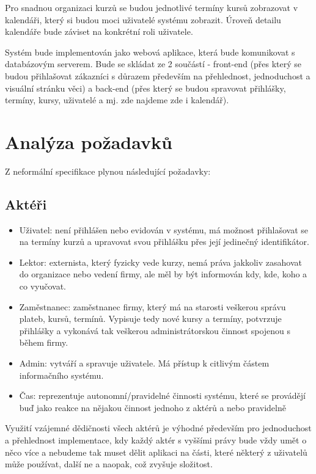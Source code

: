 \documentclass[12pt,a4paper,titlepage,final]{report}
\begin{document}
	Pro snadnou organizaci kurzů se budou jednotlivé termíny kursů zobrazovat v kalendáři, který si budou moci uživatelé systému zobrazit. Úroveň detailu kalendáře bude záviset na konkrétní roli uživatele.
	
	Systém bude implementován jako webová aplikace, která bude komunikovat s databázovým serverem. Bude se skládat ze 2 součástí - front-end (přes který se budou přihlašovat zákazníci s důrazem především na přehlednost, jednoduchost a visuální stránku věci)
a back-end (přes který se budou spravovat přihlášky, termíny, kursy, uživatelé a mj. zde najdeme zde i kalendář).


	\section{Analýza požadavků}
	Z neformální specifikace plynou následující požadavky:
	
	\subsection{Aktéři}		
	
		\begin{itemize}
			\item Uživatel: není přihlášen nebo evidován v systému, má možnost přihlašovat se na termíny kurzů a upravovat svou přihlášku přes její jedinečný identifikátor.
			\item Lektor: externista, který fyzicky vede kurzy, nemá práva jakkoliv zasahovat do organizace nebo vedení firmy, ale měl by být informován kdy, kde, koho a co vyučovat.
			\item Zaměstnanec: zaměstnanec firmy, který má na starosti veškerou správu plateb, kursů, termínů. Vypisuje tedy nové kursy a termíny, potvrzuje přihlášky a vykonává tak veškerou administrátorskou činnost spojenou s během firmy.
			\item Admin: vytváří a spravuje uživatele. Má přístup k citlivým částem informačního systému.
			\item Čas: reprezentuje autonomní/pravidelné činnosti systému, které se provádějí buď jako reakce na nějakou činnost jednoho z aktérů a nebo pravidelně
		\end{itemize}
		
	Využití vzájemné dědičnosti všech aktérů je výhodné především pro jednoduchost a přehlednost implementace, kdy každý aktér s vyššími právy bude vždy umět o něco více a nebudeme tak muset dělit aplikaci na části, které některý z uživatelů může používat, další ne a naopak, což zvyšuje složitost.
		
\end{document}
